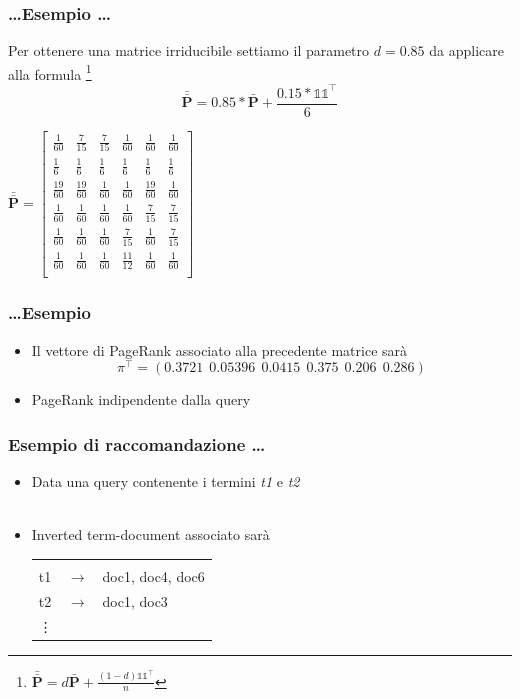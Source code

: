 \documentclass{beamer}
\begin{document}
\begin{frame}
	\frametitle{\dots Esempio \dots}
	Per ottenere una matrice irriducibile settiamo il parametro $d=0.85$ da applicare alla formula \footnote{$\bar{\bar{\textbf{P}}} = d\bar{\textbf{P}} + \frac{(1-d)\mathbb{11}^\intercal}{n}$}
	$$\bar{\bar{\textbf{P}}} = 0.85*\bar{\textbf{P}} + \frac{0.15*\mathbb{11}^\intercal}{6}$$
	\begin{center}
		$\bar{\bar{\textbf{P}}} = \begin{bmatrix}
		\frac{1}{60} & \frac{7}{15}  & \frac{7}{15} & \frac{1}{60} &\frac{1}{60} &\frac{1}{60} \\[0.3em]
		\frac{1}{6}  & \frac{1}{6}   & \frac{1}{6}  & \frac{1}{6}  &\frac{1}{6}  &\frac{1}{6}  \\[0.3em]
		\frac{19}{60}& \frac{19}{60} & \frac{1}{60} & \frac{1}{60} &\frac{19}{60}&\frac{1}{60} \\[0.3em]
		\frac{1}{60} & \frac{1}{60}  & \frac{1}{60} & \frac{1}{60} &\frac{7}{15} &\frac{7}{15} \\[0.3em]
		\frac{1}{60} & \frac{1}{60}  & \frac{1}{60} & \frac{7}{15} &\frac{1}{60} &\frac{7}{15} \\[0.3em]
		\frac{1}{60} & \frac{1}{60}  & \frac{1}{60} & \frac{11}{12}&\frac{1}{60} &\frac{1}{60} \\[0.3em]
		\end{bmatrix}$
	\end{center}
\end{frame}
\begin{frame}
	\frametitle{\dots Esempio}
	\begin{itemize}
		\item Il vettore di PageRank associato alla precedente matrice sarà $$\pi^\intercal=(0.3721~~0.05396~~0.0415~~0.375~~0.206~~0.286)$$
		\item PageRank indipendente dalla query
	\end{itemize}
\end{frame}
\begin{frame}
	\frametitle{Esempio di raccomandazione \dots}
	\begin{itemize}
		\item Data una query contenente i termini \emph{t1} e \emph{t2} \\~\\
		\item Inverted term-document associato sarà
		\begin{center}
			\begin{tabular}{ l c l }
				&&\\
				t1 & $\longrightarrow$ & doc1, doc4, doc6 \\
				t2 & $\longrightarrow$ & doc1, doc3 \\
				\vdots & & \\
			\end{tabular}
		\end{center}
	\end{itemize}
\end{frame}
\end{document}
